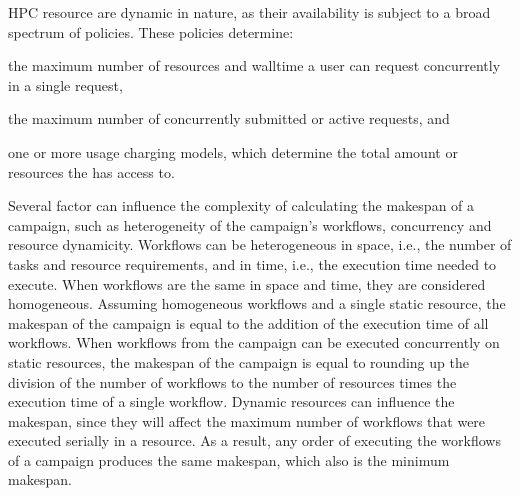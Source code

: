HPC resource are dynamic in nature, as their availability is subject to a broad spectrum of policies.
These policies determine:
\begin{inparaenum}[1)]
\item the maximum number of resources and walltime a user can request concurrently in a single request,
\item the maximum number of concurrently submitted or active requests, and
\item one or more usage charging models, which determine the total amount or resources the has access to.
\end{inparaenum}


Several factor can influence the complexity of calculating the makespan of a campaign, such as heterogeneity of the campaign's workflows, concurrency and resource dynamicity.
Workflows can be heterogeneous in space, i.e., the number of tasks and resource requirements, and in time, i.e., the execution time needed to execute.
When workflows are the same in space and time, they are considered homogeneous.
Assuming homogeneous workflows and a single static resource, the makespan of the campaign is equal to the addition of the execution time of all workflows.
When workflows from the campaign can be executed concurrently on static resources, the makespan of the campaign is equal to rounding up the division of the number of workflows to the number of resources times the execution time of a single workflow.
Dynamic resources can influence the makespan, since they will affect the maximum number of workflows that were executed serially in a resource.
As a result, any order of executing the workflows of a campaign produces the same makespan, which also is the minimum makespan.

